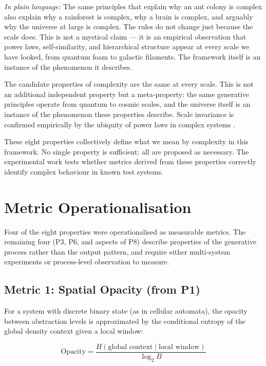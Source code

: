 \documentclass[12pt,a4paper]{article}
\begin{document}
\textit{In plain language:} The same principles that explain why an
ant colony is complex also explain why a rainforest is complex, why
a brain is complex, and arguably why the universe at large is complex.
The rules do not change just because the scale does.
This is not a mystical claim — it is an empirical observation that
power laws, self-similarity, and hierarchical structure appear at every
scale we have looked, from quantum foam to galactic filaments.
The framework itself is an instance of the phenomenon it describes.

The candidate properties of complexity are the same at every scale.
This is not an additional independent property but a meta-property:
the same generative principles operate from quantum to cosmic scales,
and the universe itself is an instance of the phenomenon these
properties describe.
Scale invariance is confirmed empirically by the ubiquity of power laws
in complex systems \citep{bak1987}.

\bigskip

These eight properties collectively define what we mean by complexity
in this framework.
No single property is sufficient; all are proposed as necessary.
The experimental work tests whether metrics derived from these
properties correctly identify complex behaviour in known test systems.

\section{Metric Operationalisation}

Four of the eight properties were operationalised as measurable metrics.
The remaining four (P3, P6, and aspects of P8) describe properties
of the generative process rather than the output pattern, and require
either multi-system experiments or process-level observation to measure.

\subsection{Metric 1: Spatial Opacity (from P1)}

For a system with discrete binary state (as in cellular automata), the
opacity between abstraction levels is approximated by the conditional
entropy of the global density context given a local window:

\begin{equation}
\text{Opacity} = \frac{H(\text{global context} \mid \text{local window})}{\log_2 B}
\end{equation}
\end{document}
